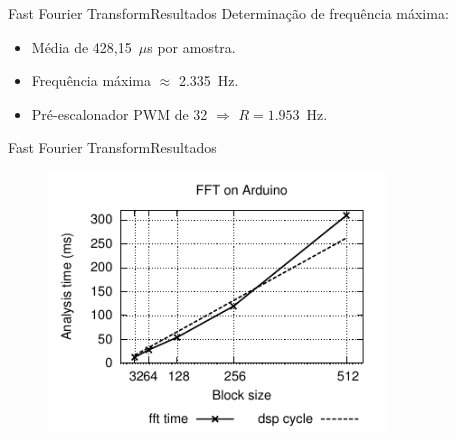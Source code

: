 \begin{frame}{Fast Fourier Transform}{Resultados}
Determinação de frequência máxima:
\begin{itemize}
  \item Média de 428,15~$\mu$s por amostra.
  \item Frequência máxima $\approx$ 2.335~Hz.
  \item Pré-escalonador PWM de 32 $\Rightarrow$ $R=1.953$~Hz.
\end{itemize}
\end{frame}

\begin{frame}{Fast Fourier Transform}{Resultados}
\begin{figure}
\includegraphics[width=0.8\textwidth]{./img/fft2.pdf}
\end{figure}
\end{frame}

